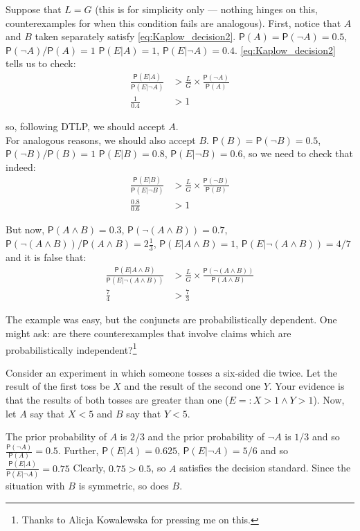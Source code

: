 \documentclass[
  10pt,
  dvipsnames,enabledeprecatedfontcommands]{scrartcl}
\newcommand{\n}{\neg}
\newcommand{\et}{\wedge}
\newcommand{\pr}[1]{\mathsf{P}(#1)}
\begin{document}
Suppose that \(L=G\) (this is for simplicity only --- nothing hinges on
this, counterexamples for when this condition fails are analogous).
First, notice that \(A\) and \(B\) taken separately satisfy
\eqref{eq:Kaplow_decision2}. \(\pr{A}=\pr{\n A}=0.5\),
\(\pr{\n A}/\pr{A}=1\) \(\pr{E\vert A}=1\), \(\pr{E\vert \n A}=0.4\).
\eqref{eq:Kaplow_decision2} tells us to check: \begin{align*}
 \frac{\pr{E\vert A}}{\pr{E\vert \n A}}&> \frac{L}{G}\times \frac{\pr{\n A}}{\pr{A}}\\
 \frac{1}{0.4} & > 1
 \end{align*}

\noindent so, following DTLP, we should accept \(A\).\\
For analogous reasons, we should also accept \(B\).
\(\pr{B}=\pr{\n B}=0.5\), \(\pr{\n B}/\pr{B}=1\) \(\pr{E\vert B}=0.8\),
\(\pr{E\vert \n B}=0.6\), so we need to check that indeed:
\begin{align*}
 \frac{\pr{E\vert B}}{\pr{E\vert \n B}}&> \frac{L}{G}\times \frac{\pr{\n B}}{\pr{B}}\\
 \frac{0.8}{0.6} & > 1 
 \end{align*}

But now, \(\pr{A\et B}=0.3\), \(\pr{\n (A \et B)}=0.7\),
\(\pr{\n (A\et B)}/\pr{A\et B}=2\frac{1}{3}\),
\(\pr{E\vert A \et B}=1\), \(\pr{E\vert \n (A\et B)}=4/7\) and it is
false that: \begin{align*}
 \frac{\pr{E\vert A \et B}}{\pr{E\vert \n (A\et B)}}&> \frac{L}{G}\times \frac{\pr{\n (A \et B)}}{\pr{A \et B}}\\
 \frac{7}{4} & > \frac{7}{3} 
 \end{align*}

The example was easy, but the conjuncts are probabilistically dependent.
One might ask: are there counterexamples that involve claims which are
probabilistically
independent?\footnote{Thanks to Alicja Kowalewska for pressing me on this.}

Consider an experiment in which someone tosses a six-sided die twice.
Let the result of the first toss be \(X\) and the result of the second
one \(Y\). Your evidence is that the results of both tosses are greater
than one (\(E=: X>1 \et Y>1\)). Now, let \(A\) say that \(X<5\) and
\(B\) say that \(Y<5\).

The prior probability of \(A\) is \(2/3\) and the prior probability of
\(\n A\) is \(1/3\) and so \(\frac{\pr{\n A}}{\pr{A}}=0.5\). Further,
\(\pr{E\vert A}=0.625\), \(\pr{E\vert \n A}= 5/6\) and so
\(\frac{\pr{E\vert A}}{\pr{E\vert \n A}}=0.75\) Clearly, \(0.75>0.5\),
so \(A\) satisfies the decision standard. Since the situation with \(B\)
is symmetric, so does \(B\).
\end{document}
